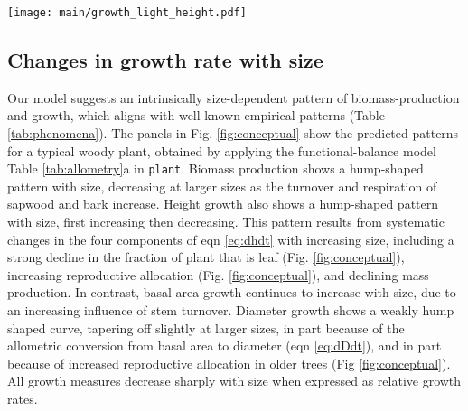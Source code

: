 \documentclass[9pt,twocolumn,twoside]{pnas-new}
\newcommand{\plant}{\texttt{plant}}
\begin{document}
\begin{SCfigure*}[\sidecaptionrelwidth][!ht]
\centering
\texttt{[image: main/growth\_light\_height.pdf]}
\caption{\textbf{Effect of four traits on height growth rate for different-sized plants.}
Growth rates were simulated using the {\plant} model, applying the trade-offs describing in Table \ref{tab:traits}. Each panel shows how growth is influenced by a different trait for plants of a given height, and across a series of canopy openness values from completely open (light blue,  $E=1$) to heavily shaded (dark line, $E=0.25$). For any given value of trait and $E$, plants were grown to the desired height and their growth rate estimated. The white regions indicate trait ranges that are typically observed in real systems. Figs. \ref{fig:growth_light_dia}-\ref{fig:growth_light_mass} show similar plots but with growth measured as stem diameter, stem area, or plant mass. Changes in trait-growth relationships are summarised in Table \ref{tab:responses}.
\label{fig:growth_light_height}}
\end{SCfigure*}

\subsection{Changes in growth rate with size}

Our model suggests an intrinsically size-dependent pattern of biomass-production and growth, which aligns with well-known empirical patterns (Table \ref{tab:phenomena}). The panels in Fig. \ref{fig:conceptual} show the predicted patterns for a typical woody plant, obtained by applying the functional-balance model Table \ref{tab:allometry}a in {\plant}. Biomass production shows a hump-shaped pattern with size, decreasing at larger sizes as the turnover and respiration of sapwood and bark increase. Height growth also shows a hump-shaped pattern with size, first increasing then decreasing. This pattern results from systematic changes in the four components of eqn \ref{eq:dhdt} with increasing size, including a strong decline in the fraction of plant that is leaf (Fig. \ref{fig:conceptual}), increasing reproductive allocation (Fig. \ref{fig:conceptual}), and declining mass production. In contrast, basal-area growth continues to increase with size, due to an increasing influence of stem turnover. Diameter growth shows a weakly hump shaped curve, tapering off slightly at larger sizes, in part because of the allometric conversion from basal area to diameter (eqn \ref{eq:dDdt}), and in part because of increased reproductive allocation in older trees (Fig \ref{fig:conceptual}). All growth measures decrease sharply with size when expressed as relative growth rates.
\end{document}
